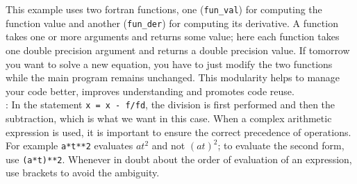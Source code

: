 \documentclass[11pt,oneside]{amsart}
\begin{document}
This example uses two fortran functions, one ({\tt fun\_val}) for computing the function value and another ({\tt fun\_der}) for computing its derivative. A function takes one or more arguments and returns some value; here each function takes one double precision argument and returns a double precision value. If tomorrow you want to solve a new equation, you have to just modify the two functions while the main program remains unchanged. This modularity helps to manage your code better, improves understanding and promotes code reuse. \\

: In the statement {\tt x = x - f/fd}, the division is first performed and then the subtraction, which is what we want in this case. When a complex arithmetic expression is used, it is important to ensure the correct precedence of operations. For example {\tt a*t**2} evaluates $at^2$ and not $(at)^2$; to evaluate the second form, use {\tt (a*t)**2}. Whenever in doubt about the order of evaluation of an expression, use brackets to avoid the ambiguity.

\end{document}
